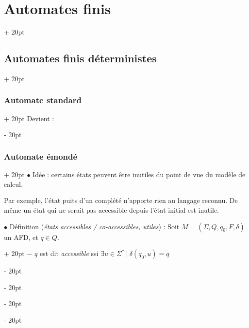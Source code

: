 \documentclass[a4paper, 12pt, twoside]{article}
\newcommand{\ind}[1][20pt]{\advance\leftskip + #1}
\newcommand{\deind}[1][20pt]{\advance\leftskip - #1}
\newenvironment{indt}[2][20pt]{#2 \par \ind[#1]}{\par \deind} %
\begin{document}
\begin{indt}{\section{Automates finis}}
\begin{indt}{\subsection{Automates finis déterministes}}
\begin{indt}{\subsubsection{Automate standard}}
                Devient :
                \begin{center}
                \end{center}
            \end{indt}

            \vspace{12pt}
            
            \begin{indt}{\subsubsection{Automate émondé}}
                $\bullet$ Idée : certains états peuvent être inutiles du point de vue du modèle de calcul.

                Par exemple, l'état puits d'un complété n'apporte rien au langage reconnu.
                De même un état qui ne serait pas accessible depuis l'état initial est inutile.

                \vspace{12pt}
                
                \begin{indt}{$\bullet$ Définition (\emph{états accessibles / co-accessibles, utiles}) : Soit $M = (\Sigma, Q, q_0, F, \delta)$ un AFD, et $q \in Q$.}
                    $-$ $q$ est dit \emph{accessible} ssi $\exists u \in \Sigma^*\ |\ \delta(q_0, u) = q$


\end{indt}
\end{indt}
\end{indt}
\end{indt}
\end{document}
